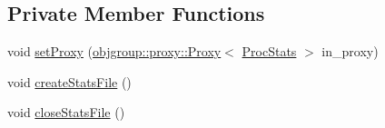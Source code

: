\subsection*{Private Member Functions}
\begin{DoxyCompactItemize}
\item 
void \hyperlink{structvt_1_1vrt_1_1collection_1_1balance_1_1_proc_stats_a3215c14cb6679e9751b0fb51d5d72fe0}{set\+Proxy} (\hyperlink{structvt_1_1objgroup_1_1proxy_1_1_proxy}{objgroup\+::proxy\+::\+Proxy}$<$ \hyperlink{structvt_1_1vrt_1_1collection_1_1balance_1_1_proc_stats}{Proc\+Stats} $>$ in\+\_\+proxy)
\item 
void \hyperlink{structvt_1_1vrt_1_1collection_1_1balance_1_1_proc_stats_a03755a56bad3f32736c8f823671bc848}{create\+Stats\+File} ()
\item 
void \hyperlink{structvt_1_1vrt_1_1collection_1_1balance_1_1_proc_stats_a64048438517e6479b5c02f6136a19265}{close\+Stats\+File} ()
\end{DoxyCompactItemize}
